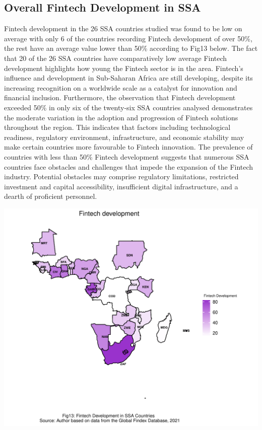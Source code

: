 \documentclass[preprint, 3p,
authoryear]{elsarticle} %
\begin{document}
\hypertarget{overall-fintech-development-in-ssa}{%
\subsection{Overall Fintech Development in
SSA}\label{overall-fintech-development-in-ssa}}

Fintech development in the 26 SSA countries studied was found to be low
on average with only 6 of the countries recording Fintech development of
over 50\%, the rest have an average value lower than 50\% according to
Fig13 below. The fact that 20 of the 26 SSA countries have comparatively
low average Fintech development highlights how young the Fintech sector
is in the area. Fintech's influence and development in Sub-Saharan
Africa are still developing, despite its increasing recognition on a
worldwide scale as a catalyst for innovation and financial inclusion.
Furthermore, the observation that Fintech development exceeded 50\% in
only six of the twenty-six SSA countries analysed demonstrates the
moderate variation in the adoption and progression of Fintech solutions
throughout the region. This indicates that factors including
technological readiness, regulatory environment, infrastructure, and
economic stability may make certain countries more favourable to Fintech
innovation. The prevalence of countries with less than 50\% Fintech
development suggests that numerous SSA countries face obstacles and
challenges that impede the expansion of the Fintech industry. Potential
obstacles may comprise regulatory limitations, restricted investment and
capital accessibility, insufficient digital infrastructure, and a dearth
of proficient personnel.

\bigskip

\includegraphics{504.Project1_files/figure-latex/unnamed-chunk-7-1.pdf}
\end{document}
